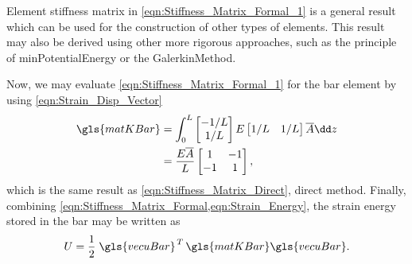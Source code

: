 %
\begin{remark}
	Element stiffness matrix in \cref{eqn:Stiffness_Matrix_Formal_1} is a general result which can be used for the construction of other types of elements. This result may also be derived using other more rigorous approaches, such as the principle of \gls{minPotentialEnergy} or the \gls{GalerkinMethod}.
\end{remark}
Now, we may evaluate \cref{eqn:Stiffness_Matrix_Formal_1} for the bar element by using \cref{eqn:Strain_Disp_Vector}
\begin{equation}	\label{eqn:Stiffness_Matrix_Formal} 
	\begin{aligned}
		\gls{matKBar} &= \int_0^L
		\begin{bmatrix} -1/L \\ 1/L \end{bmatrix} E 
			\begin{bmatrix} 1/L	& 1/L \end{bmatrix} \overline{A} \dd z \\
		&= \frac{ E \overline{A} }{ L } \begin{bmatrix} 1 & -1	\\ -1 &	1 \end{bmatrix},
	\end{aligned}
\end{equation}
%
which is the same result as \cref{eqn:Stiffness_Matrix_Direct}, direct method. Finally, combining
\cref{eqn:Stiffness_Matrix_Formal,eqn:Strain_Energy}, the strain energy stored in the bar may be written as
\begin{equation}
	U = \frac{1}{2} \left. \gls{vecuBar} \right.^T \gls{matKBar} \gls{vecuBar}.
\end{equation}
%